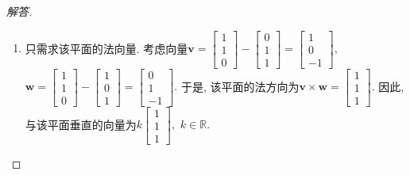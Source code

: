 \documentclass[UTF8]{ctexart}
\newcommand\bs[1]{\boldsymbol{ #1}}
\begin{document}
\begin{proof}[解答]
\begin{enumerate}
\item 只需求该平面的法向量. 考虑向量$\bs v = \begin{bmatrix}
				1 \\  1\\  0
			\end{bmatrix} - \begin{bmatrix}
				0 \\  1\\  1
			\end{bmatrix} = \begin{bmatrix}
				1 \\  0\\  -1
			\end{bmatrix} ,$ $ \bs w = \begin{bmatrix}
				1 \\  1\\  0
			\end{bmatrix}-\begin{bmatrix}
				1 \\  0\\  1
			\end{bmatrix} = \begin{bmatrix}
				0 \\  1\\  -1
			\end{bmatrix}.$ 于是, 该平面的法方向为$\bs v\times \bs w = \begin{bmatrix}
				1 \\  1\\  1
			\end{bmatrix}.$ 因此, 与该平面垂直的向量为$k\begin{bmatrix}
				1 \\  1\\  1
			\end{bmatrix},$ $k\in \mathbb{R}.$

\end{enumerate}
\end{proof}
\end{document}
